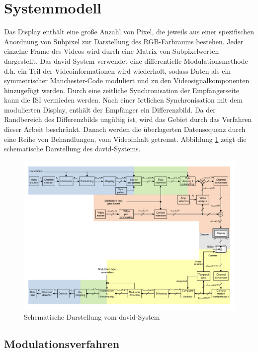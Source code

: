 \section{Systemmodell} 
Das Display enthält eine große Anzahl von Pixel, die jeweils aus einer spezifischen Anordnung von Subpixel zur Darstellung des RGB-Farbraums bestehen. Jeder einzelne Frame des Videos wird durch eine Matrix von Subpixelwerten dargestellt. Das \gls{david}-System verwendet eine differentielle Modulationsmethode d.h. ein Teil der Videoinformationen wird wiederholt, sodass Daten als ein symmetrischer Manchester-Code moduliert und zu den Videosignalkomponenten hinzugefügt werden. Durch eine zeitliche Synchronisation der Empfängerseite kann die \gls{ISI} vermieden werden. Nach einer örtlichen Synchronisation mit dem modulierten Display, enthält der Empfänger ein Differenzbild. Da der Randbereich des Differenzbilds ungültig ist, wird das Gebiet durch das Verfahren dieser Arbeit beschränkt. Danach werden die überlagerten Datensequenz durch eine Reihe von Behandlungen, vom Videoinhalt getrennt. Abbildung \ref{fig:David2} zeigt die schematische Darstellung des \gls{david}-Systems. 
\vspace{18pt}

\begin{figure}[htb]
	\centering 
	\includegraphics[keepaspectratio,width=1.0\textwidth]{images/2_DaViD/1.pdf}
	\caption{Schematische Darstellung vom \gls{david}-System}
	\label{fig:David2}
\end{figure}


\subsection{Modulationsverfahren}

